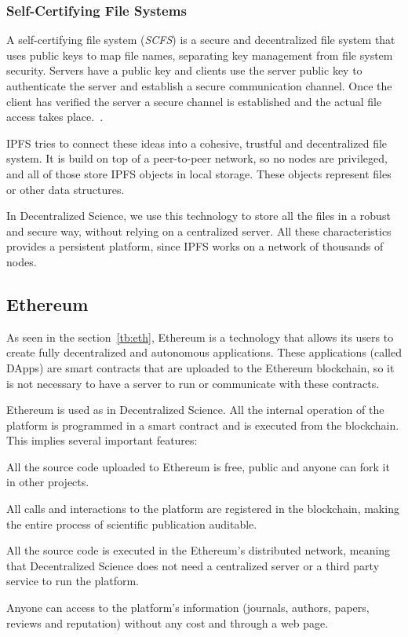 \subsubsection*{Self-Certifying File Systems}
\label{tech:sec:ipfs:scfs}

A self-certifying file system (\emph{SCFS}) is a secure and
decentralized file system that uses public keys to map file names, separating
key management from file system security. Servers have a public key and clients
use the server public key to authenticate the server and establish a secure
communication channel. Once the client has verified the server a secure channel
is established and the actual file access takes place.~\cite{mazieres2000self}.

IPFS tries to connect these ideas into a cohesive, trustful and decentralized
file system. It is build on top of a peer-to-peer network, so no nodes are
privileged, and all of those store IPFS objects in local storage. These objects
represent files or other data structures.

In Decentralized Science, we use this technology to store all the files in a
robust and secure way, without relying on a centralized server. All these
characteristics provides a persistent platform, since IPFS works on a network of
thousands of nodes.

\subsection{Ethereum}
\label{tech:sec:ethereum}

As seen in the section~\ref{tb:eth}, Ethereum is a technology that allows its
users to create fully decentralized and autonomous applications. These applications
(called DApps) are smart contracts that are uploaded to the Ethereum blockchain,
so it is not necessary to have a server to run or communicate with these
contracts.

Ethereum is used as  in Decentralized Science. All the internal
operation of the platform is programmed in a smart contract and is executed from the
blockchain. This implies several important features:

\begin{itemize}
   All the source code uploaded to Ethereum is free, public
  and anyone can fork it in other projects.

   All calls and interactions to the platform are
  registered in the blockchain, making the entire process of scientific publication
  auditable.

   All the source code is executed in the Ethereum's
  distributed network, meaning that Decentralized Science does not need a
  centralized server or a third party service to run the platform.

   Anyone can access to the platform's
  information (journals, authors, papers, reviews and reputation) without any
  cost and through a web page.
\end{itemize}

